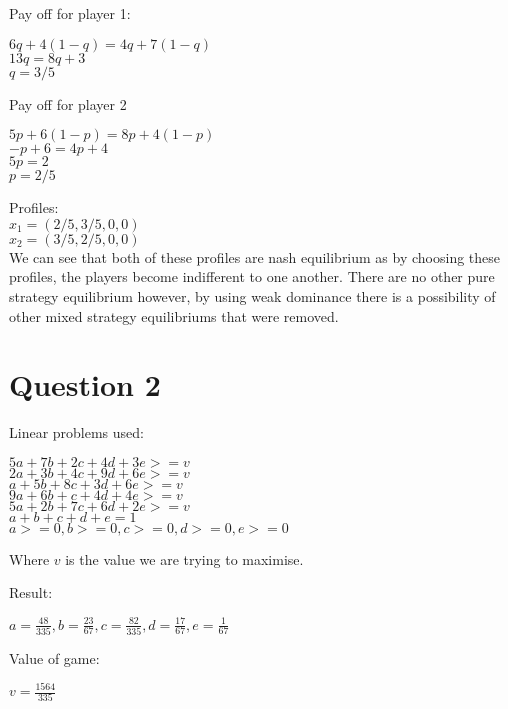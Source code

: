 \documentclass[11pt]{article}
\begin{document}
Pay off for player 1:
\begin{center}
$6q + 4(1 - q) = 4q + 7(1 - q)$ \\
$13q = 8q + 3$\\
$q = 3/5$\\
\end{center}

Pay off for player 2
\begin{center}
$5p + 6(1 - p) = 8p + 4(1 - p)$\\
$-p + 6 = 4p + 4$\\
$5p = 2$\\
$p = 2 / 5$
\end{center}

Profiles:\\
	$x_{1} = (2/5, 3/5, 0, 0)$ \\
	$x_{2} = (3/5, 2/5, 0, 0)$ \\
	
We can see that both of these profiles are nash equilibrium as by choosing these profiles, the players become indifferent to one another. There are no other pure strategy equilibrium however, by using weak dominance there is a possibility of other mixed strategy equilibriums that were removed. 

\section{Question 2}

Linear problems used:
\begin{center}
$5a + 7b + 2c + 4d + 3e >= v$ \\
$2a + 3b + 4c + 9d + 6e >= v$ \\
$a + 5b + 8c + 3d + 6e >= v$ \\
$9a + 6b + c + 4d + 4e >= v$ \\
$5a + 2b + 7c + 6d + 2e >= v$ \\
$a + b + c + d + e = 1$ \\
$a >= 0, b>=0, c>=0, d>=0, e>=0$
\end{center}

Where $v$ is the value we are trying to maximise.

Result:\\
\begin{center}
$a = \frac{48}{335}, b = \frac{23}{67}, c=\frac{82}{335}, d = \frac{17}{67}, e = \frac{1}{67}$
\end{center}

Value of game: 
\begin{center}
$v = \frac{1564}{335}$
\end{center}
\end{document}
